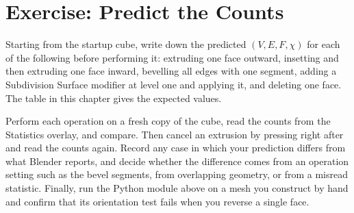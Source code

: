 \section{Exercise: Predict the Counts}

\begin{exercise}
Starting from the startup cube, write down the predicted $(V,E,F,\chi)$ for each of the following before performing it: extruding one face outward, insetting and then extruding one face inward, bevelling all edges with one segment, adding a Subdivision Surface modifier at level one and applying it, and deleting one face. The table in this chapter gives the expected values.

Perform each operation on a fresh copy of the cube, read the counts from the Statistics overlay, and compare. Then cancel an extrusion by pressing  right after  and read the counts again. Record any case in which your prediction differs from what Blender reports, and decide whether the difference comes from an operation setting such as the bevel segments, from overlapping geometry, or from a misread statistic. Finally, run the Python module above on a mesh you construct by hand and confirm that its orientation test fails when you reverse a single face.
\end{exercise}
